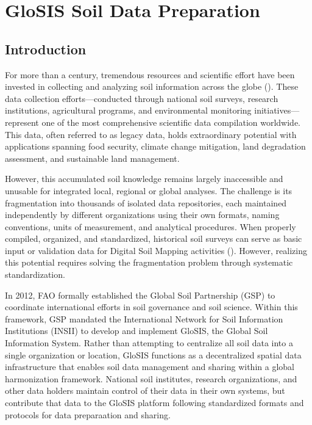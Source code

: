\documentclass[
  10pt,
  b5paper,
  oneside]{book}
\begin{document}
\section{GloSIS Soil Data Preparation}\label{glosis-soil-data-preparation}

\subsection{Introduction}\label{introduction-2}

For more than a century, tremendous resources and scientific effort have been invested in collecting and analyzing soil information across the globe (). These data collection efforts---conducted through national soil surveys, research institutions, agricultural programs, and environmental monitoring initiatives---represent one of the most comprehensive scientific data compilation worldwide. This data, often referred to as legacy data, holds extraordinary potential with applications spanning food security, climate change mitigation, land degradation assessment, and sustainable land management.

However, this accumulated soil knowledge remains largely inaccessible and unusable for integrated local, regional or global analyses. The challenge is its fragmentation into thousands of isolated data repositories, each maintained independently by different organizations using their own formats, naming conventions, units of measurement, and analytical procedures. When properly compiled, organized, and standardized, historical soil surveys can serve as basic input or validation data for Digital Soil Mapping activities (). However, realizing this potential requires solving the fragmentation problem through systematic standardization.

In 2012, FAO formally established the Global Soil Partnership (GSP) to coordinate international efforts in soil governance and soil science. Within this framework, GSP mandated the International Network for Soil Information Institutions (INSII) to develop and implement GloSIS, the Global Soil Information System. Rather than attempting to centralize all soil data into a single organization or location, GloSIS functions as a decentralized spatial data infrastructure that enables soil data management and sharing within a global harmonization framework. National soil institutes, research organizations, and other data holders maintain control of their data in their own systems, but contribute that data to the GloSIS platform following standardized formats and protocols for data preparaation and sharing.
\end{document}
